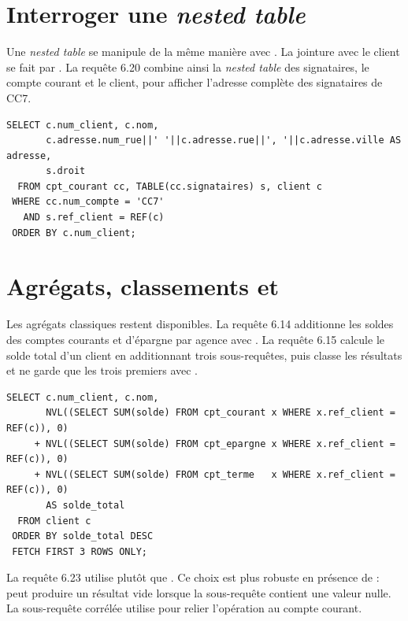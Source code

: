 \section{Interroger une \emph{nested table}}

Une \emph{nested table} se manipule de la même manière avec .
La jointure avec le client se fait par . La
requête 6.20 combine ainsi la \emph{nested table} des signataires, le compte
courant et le client, pour afficher l'adresse complète des signataires de CC7.

\begin{lstlisting}[caption={Signataires de CC7 avec adresse.},label={lst:nested-table}]
SELECT c.num_client, c.nom,
       c.adresse.num_rue||' '||c.adresse.rue||', '||c.adresse.ville AS adresse,
       s.droit
  FROM cpt_courant cc, TABLE(cc.signataires) s, client c
 WHERE cc.num_compte = 'CC7'
   AND s.ref_client = REF(c)
 ORDER BY c.num_client;
\end{lstlisting}

\section{Agrégats, classements et }

Les agrégats classiques restent disponibles. La requête 6.14 additionne les
soldes des comptes courants et d'épargne par agence avec . La
requête 6.15 calcule le solde total d'un client en additionnant trois
sous-requêtes, puis classe les résultats et ne garde que les trois premiers
avec .

\begin{lstlisting}[caption={Top 3 des clients par solde total.},label={lst:top3}]
SELECT c.num_client, c.nom,
       NVL((SELECT SUM(solde) FROM cpt_courant x WHERE x.ref_client = REF(c)), 0)
     + NVL((SELECT SUM(solde) FROM cpt_epargne x WHERE x.ref_client = REF(c)), 0)
     + NVL((SELECT SUM(solde) FROM cpt_terme   x WHERE x.ref_client = REF(c)), 0)
       AS solde_total
  FROM client c
 ORDER BY solde_total DESC
 FETCH FIRST 3 ROWS ONLY;
\end{lstlisting}

La requête 6.23 utilise  plutôt que . Ce choix
est plus robuste en présence de  :  peut produire un
résultat vide lorsque la sous-requête contient une valeur nulle. La
sous-requête corrélée utilise  pour relier l'opération au compte
courant.

